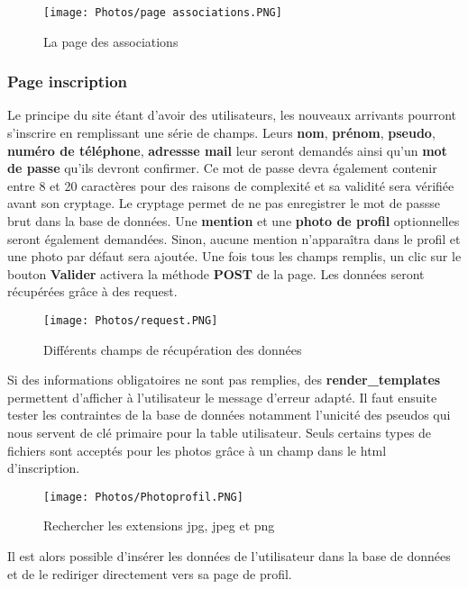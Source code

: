 \documentclass{article}
\begin{document}
\begin{figure}[h!]
    \centering
    \texttt{[image: Photos/page associations.PNG]}
    \caption{La page des associations}
    \label{fig:my_label}
\end{figure}
\subsubsection{Page inscription}
Le principe du site étant d'avoir des utilisateurs, les nouveaux arrivants pourront s'inscrire en remplissant une série de champs. Leurs \textbf{nom}, \textbf{prénom}, \textbf{pseudo}, \textbf{numéro de téléphone}, \textbf{adressse mail} leur seront demandés ainsi qu'un \textbf{mot de passe} qu'ils devront confirmer. Ce mot de passe devra également contenir entre 8 et 20 caractères pour des raisons de complexité et sa validité sera vérifiée avant son cryptage. Le cryptage permet de ne pas enregistrer le mot de passse brut dans la base de données. Une \textbf{mention} et une \textbf{photo de profil} optionnelles seront également demandées. Sinon, aucune mention n'apparaîtra dans le profil et une photo par défaut sera ajoutée.
Une fois tous les champs remplis, un clic sur le bouton \textbf{Valider} activera la méthode \textbf{POST} de la page. Les données seront récupérées grâce à des request.
\begin{figure}[h!]
    \centering
    \texttt{[image: Photos/request.PNG]}
    \caption{Différents champs de récupération des données}
    \label{fig:my_label}
\end{figure}
\newline Si des informations obligatoires ne sont pas remplies, des \textbf{render\_templates} permettent d'afficher à l'utilisateur le message d'erreur adapté. Il faut ensuite tester les contraintes de la base de données notamment l'unicité des pseudos qui nous servent de clé primaire pour la table utilisateur. Seuls certains types de fichiers sont acceptés pour les photos grâce à un champ dans le html d'inscription.

\begin{figure}[h!]
    \centering
    \texttt{[image: Photos/Photoprofil.PNG]}
    \caption{Rechercher les extensions jpg, jpeg et png}
    \label{fig:my_label}
\end{figure}
\newline
 Il est alors possible d'insérer les données de l'utilisateur dans la base de données et de le rediriger directement vers sa page de profil.
\end{document}
